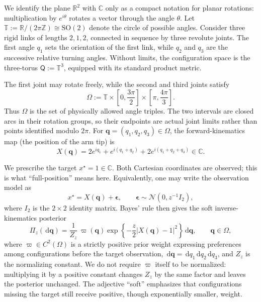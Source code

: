 \documentclass[11pt]{amsart}
\numberwithin{equation}{section}
\theoremstyle{definition}
\theoremstyle{remark}
\newcommand{\R}{\mathbb{R}}
\newcommand{\C}{\mathbb{C}}
\newcommand{\dd}{\,\mathrm{d}}
\begin{document}
We identify the plane $\R^2$ with $\C$ only as a compact notation for planar
rotations: multiplication by $e^{i\theta}$ rotates a vector through the angle
$\theta$.  Let
$\mathbb T:=\R/(2\pi\mathbb Z)\cong\mathrm{SO}(2)$ denote the circle of possible
angles.  Consider three rigid links of lengths $2,1,2$, connected in sequence
by three revolute joints.  The first angle $q_1$ sets the orientation of the
first link, while $q_2$ and $q_3$ are the successive relative turning angles.
Without limits, the configuration space is the three-torus
$\mathsf Q:=\mathbb T^3$, equipped with its standard product metric.

The first joint may rotate freely, while the second and third joints satisfy
\begin{equation}\label{eq:robot-domain}
 \Omega:=\mathbb T\times
 \left[0,\frac{3\pi}{2}\right]\times
 \left[\pi,\frac{4\pi}{3}\right].
\end{equation}
Thus $\Omega$ is the set of physically allowed angle triples.  The two
intervals are closed arcs in their rotation groups, so their endpoints are
actual joint limits rather than points identified modulo $2\pi$.  For
$\bm q=(q_1,q_2,q_3)\in\Omega$, the forward-kinematics map (the position of
the arm tip) is
\begin{equation}\label{eq:robot-forward-map}
 X(\bm q)
 =2e^{iq_1}+e^{i(q_1+q_2)}+2e^{i(q_1+q_2+q_3)}\in\C.
\end{equation}

We prescribe the target $x^\star=1\in\C$.  Both Cartesian coordinates are
observed; this is what ``full-position'' means here.  Equivalently, one may
write the observation model as
\[
 x^\star=X(\bm q)+\bm\epsilon,
 \qquad
 \bm\epsilon\sim\mathcal N(0,z^{-1}I_2),
\]
where $I_2$ is the $2\times2$ identity matrix.
Bayes' rule then gives the soft inverse-kinematics posterior
\begin{equation}\label{eq:robot-posterior}
 \Pi_z(\dd \bm q)
 =\frac1{Z_z}\,\varpi(\bm q)
 \exp\left\{-\frac z2|X(\bm q)-1|^2\right\}\dd \bm q,
 \qquad \bm q\in\Omega,
\end{equation}
where $\varpi\in C^2(\Omega)$ is a strictly positive prior weight expressing
preferences among configurations before the target observation,
$\dd \bm q=\dd q_1\dd q_2\dd q_3$, and $Z_z$ is the normalizing constant.  We do
not require $\varpi$ itself to be normalized: multiplying it by a positive
constant changes $Z_z$ by the same factor and leaves the posterior unchanged.
The adjective ``soft'' emphasizes that configurations missing the target still
receive positive, though exponentially smaller, weight.
\end{document}
